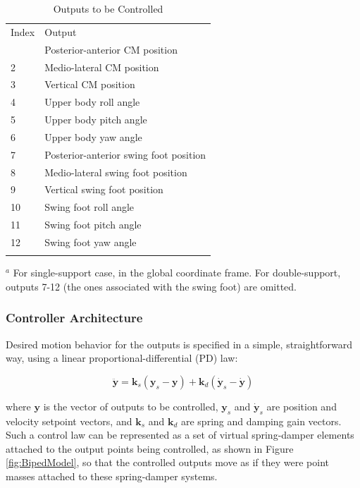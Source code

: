 \documentclass{llncs}
\begin{document}
\begin{table}
\caption{Outputs to be Controlled}
\label{tab:ControlOutputs}   

\begin{tabular}{p{3cm}p{8.5cm}}
\hline\noalign{\smallskip}
Index & Output \\
\noalign{\smallskip} \hline
1 & Posterior-anterior CM position\\
2 & Medio-lateral CM position\\
3 & Vertical CM position\\
4 & Upper body roll angle\\
5 & Upper body pitch angle\\
6 & Upper body yaw angle\\
7 & Posterior-anterior swing foot position\\
8 & Medio-lateral swing foot position\\
9 & Vertical swing foot position\\
10 & Swing foot roll angle\\
11 & Swing foot pitch angle\\
12 & Swing foot yaw angle\\
\noalign{\smallskip}\hline\noalign{\smallskip}
\end{tabular}
$^a$ For single-support case, in the global coordinate frame.  For double-support, outputs 7-12 (the ones associated with the swing foot) are omitted.
\end{table}


\subsubsection{Controller Architecture}

Desired motion behavior for the outputs is specified in a simple, straightforward way, using a linear proportional-differential (PD) law:

\begin{equation}
\ddot{\mathbf{y}} = \mathbf{k}_s \left( \mathbf{y}_s - \mathbf{y}\right) + \mathbf{k}_d \left( \dot{\mathbf{y}}_s - \dot{\mathbf{y}}\right)
\label{eq:DesiredMotion}
\end{equation}

\noindent where $\mathbf{y}$ is the vector of outputs to be controlled, $\mathbf{y}_s$ and $\dot{\mathbf{y}}_s$ are position and velocity
setpoint vectors, and $\mathbf{k}_s$ and $\mathbf{k}_d$ are spring and damping gain vectors.
Such a control law can be represented as a set of virtual spring-damper elements attached to the output points being controlled, as shown in 
Figure \ref{fig:BipedModel}, so that the controlled outputs move as if they were point masses attached to these spring-damper systems.
\end{document}
